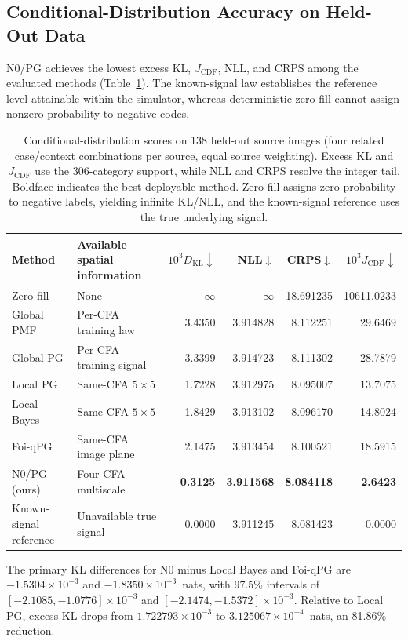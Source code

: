 \documentclass[10pt,twocolumn,journal]{IEEEtran}
\begin{document}
\subsection{Conditional-Distribution Accuracy on Held-Out Data}
N0/PG achieves the lowest excess KL, $J_{\mathrm{CDF}}$, NLL, and CRPS among the evaluated methods (Table~\ref{tab:holdout}). The known-signal law establishes the reference level attainable within the simulator, whereas deterministic zero fill cannot assign nonzero probability to negative codes.

\begin{table}[t]
\centering
\caption{Conditional-distribution scores on 138 held-out source images (four related case/context combinations per source, equal source weighting). Excess KL and $J_{\mathrm{CDF}}$ use the 306-category support, while NLL and CRPS resolve the integer tail. Boldface indicates the best deployable method. Zero fill assigns zero probability to negative labels, yielding infinite KL/NLL, and the known-signal reference uses the true underlying signal.}
\label{tab:holdout}
\small
\begin{tabular}{@{}llrrrr@{}}
\toprule
Method & Available spatial information & $10^3D_{\mathrm{KL}}\downarrow$ & NLL$\downarrow$ & CRPS$\downarrow$ & $10^3J_{\mathrm{CDF}}\downarrow$\\
\midrule
Zero fill & None & $\infty$ & $\infty$ & 18.691235 & 10611.0233\\
Global PMF & Per-CFA training law & 3.4350 & 3.914828 & 8.112251 & 29.6469\\
Global PG & Per-CFA training signal & 3.3399 & 3.914723 & 8.111302 & 28.7879\\
Local PG & Same-CFA $5\times5$ & 1.7228 & 3.912975 & 8.095007 & 13.7075\\
Local Bayes & Same-CFA $5\times5$ & 1.8429 & 3.913102 & 8.096170 & 14.8024\\
Foi-qPG & Same-CFA image plane & 2.1475 & 3.913454 & 8.100521 & 18.5915\\
N0/PG (ours) & Four-CFA multiscale & \textbf{0.3125} & \textbf{3.911568} & \textbf{8.084118} & \textbf{2.6423}\\
Known-signal reference & Unavailable true signal & 0.0000 & 3.911245 & 8.081423 & 0.0000\\
\bottomrule
\end{tabular}
\end{table}

The primary KL differences for N0 minus Local Bayes and Foi-qPG are $-1.5304\times10^{-3}$ and $-1.8350\times10^{-3}$~nats, with 97.5\% intervals of $[-2.1085,-1.0776]\times10^{-3}$ and $[-2.1474,-1.5372]\times10^{-3}$. Relative to Local PG, excess KL drops from $1.722793\times10^{-3}$ to $3.125067\times10^{-4}$~nats, an 81.86\% reduction.
\end{document}
